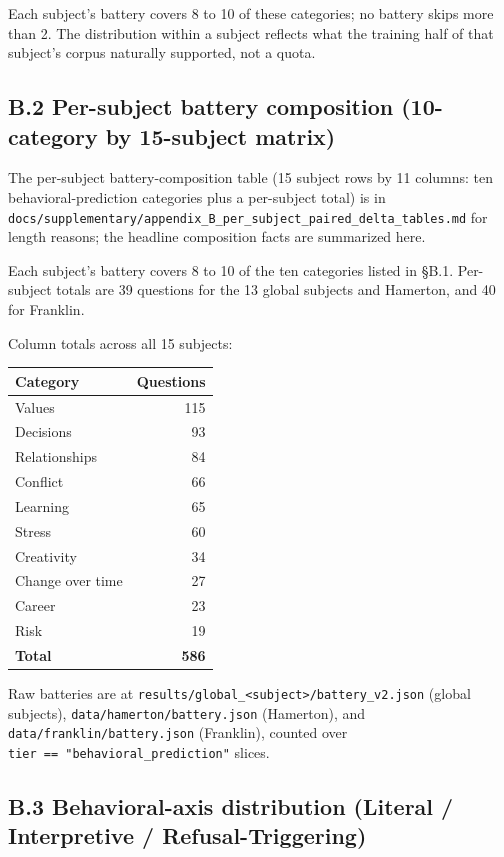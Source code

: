 Each subject's battery covers 8 to 10 of these categories; no battery
skips more than 2. The distribution within a subject reflects what the
training half of that subject's corpus naturally supported, not a quota.

\hypertarget{b.2-per-subject-battery-composition-10-category-by-15-subject-matrix}{%
\subsection{B.2 Per-subject battery composition (10-category by
15-subject
matrix)}\label{b.2-per-subject-battery-composition-10-category-by-15-subject-matrix}}

The per-subject battery-composition table (15 subject rows by 11
columns: ten behavioral-prediction categories plus a per-subject total)
is in
\texttt{docs/supplementary/appendix\_B\_per\_subject\_paired\_delta\_tables.md}
for length reasons; the headline composition facts are summarized here.

Each subject's battery covers 8 to 10 of the ten categories listed in
§B.1. Per-subject totals are 39 questions for the 13 global subjects and
Hamerton, and 40 for Franklin.

Column totals across all 15 subjects:

\begin{longtable}[]{@{}lr@{}}
\toprule
Category & Questions \\
\midrule
\endhead
Values & 115 \\
Decisions & 93 \\
Relationships & 84 \\
Conflict & 66 \\
Learning & 65 \\
Stress & 60 \\
Creativity & 34 \\
Change over time & 27 \\
Career & 23 \\
Risk & 19 \\
\textbf{Total} & \textbf{586} \\
\bottomrule
\end{longtable}

Raw batteries are at
\texttt{results/global\_\textless{}subject\textgreater{}/battery\_v2.json}
(global subjects), \texttt{data/hamerton/battery.json} (Hamerton), and
\texttt{data/franklin/battery.json} (Franklin), counted over
\texttt{tier\ ==\ "behavioral\_prediction"} slices.

\hypertarget{b.3-behavioral-axis-distribution-literal-interpretive-refusal-triggering}{%
\subsection{B.3 Behavioral-axis distribution (Literal / Interpretive /
Refusal-Triggering)}\label{b.3-behavioral-axis-distribution-literal-interpretive-refusal-triggering}}

